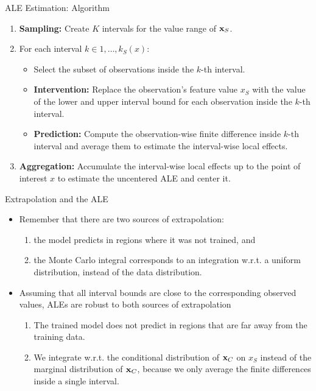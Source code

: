 \documentclass[11pt,compress,t,notes=noshow, xcolor=table]{beamer}
\begin{document}
\begin{vbframe}{ALE Estimation: Algorithm}

\begin{enumerate}
	\item \textbf{Sampling:} Create $K$ intervals for the value range of $\xv_S$.
	\item For each interval $k \in 1, \dots, k_S(x)$:
	  \begin{itemize}
	  \item Select the subset of observations inside the $k$-th interval.
	  \item \textbf{Intervention:} Replace the observation's feature value $x_S$ with the value of the lower and upper interval bound for each observation inside the $k$-th interval.
	  \item \textbf{Prediction:} Compute the observation-wise finite difference inside $k$-th interval and average them to estimate the interval-wise local effects.
	  \end{itemize}
  \item \textbf{Aggregation:} Accumulate the interval-wise local effects up to the point of interest $x$ to estimate the uncentered ALE and center it.
\end{enumerate}

\end{vbframe}

\begin{vbframe}{Extrapolation and the ALE}
\begin{itemize}
\item Remember that there are two sources of extrapolation:
  \begin{enumerate}
  \item the model predicts in regions where it was not trained, and
  \item the Monte Carlo integral corresponds to an integration w.r.t. a uniform distribution, instead of the data distribution.
  \end{enumerate}
\item Assuming that all interval bounds are close to the corresponding observed values, ALEs are robust to both sources of extrapolation
  \begin{enumerate}
    \item The trained model does not predict in regions that are far away from the training data. %
    \item We integrate w.r.t. the conditional distribution of $\xv_C$ on $x_S$ instead of the marginal distribution of $\xv_C$, because we only average the finite differences inside a single interval.
  \end{enumerate}
\end{itemize}
\end{vbframe}
\end{document}
